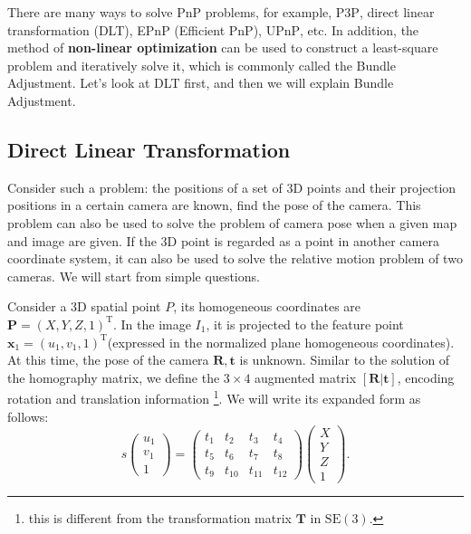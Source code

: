 There are many ways to solve PnP problems, for example, P3P\textsuperscript{\cite{GaoHouTangEtAl2003}}, direct linear transformation (DLT), EPnP (Efficient PnP)\textsuperscript{\cite{LepetitMoreno-NoguerFua2008 }}, UPnP\textsuperscript{\cite{Penate-SanchezAndrade-CettoMoreno-Noguer2013}}, etc. In addition, the method of \textbf{non-linear optimization} can be used to construct a least-square problem and iteratively solve it, which is commonly called the Bundle Adjustment. Let's look at DLT first, and then we will explain Bundle Adjustment.

\subsection{Direct Linear Transformation}
Consider such a problem: the positions of a set of 3D points and their projection positions in a certain camera are known, find the pose of the camera. This problem can also be used to solve the problem of camera pose when a given map and image are given. If the 3D point is regarded as a point in another camera coordinate system, it can also be used to solve the relative motion problem of two cameras. We will start from simple questions.

Consider a 3D spatial point $P$, its homogeneous coordinates are ${\bm{P}}=(X,Y,Z,1)^{\mathrm{T}}$. In the image $I_{1}$, it is projected to the feature point ${\bm{x}}_{1}=(u_{1},v_{1},1)^{\mathrm{T}}$(expressed in the normalized plane homogeneous coordinates). At this time, the pose of the camera $\bm{R}, \bm{t}$ is unknown. Similar to the solution of the homography matrix, we define the $3\times 4$ augmented matrix $[\bm{R}|\bm{t}]$, encoding rotation and translation information \footnote{this is different from the transformation matrix $\bm{T}$ in $\mathrm{SE}(3)$. }. We will write its expanded form as follows:
\begin{equation}
s
\begin{pmatrix}
u_{1} \\ v_{1} \\ 1
\end{pmatrix}
=
\begin{pmatrix}
t_{1} & t_{2} & t_{3} & t_{4}\\ 
t_{5} & t_{6} & t_{7} & t_{8}\\ 
t_{9} & t_{10} & t_{11} & t_{12}
\end{pmatrix}
\begin{pmatrix}
X \\ Y \\ Z \\ 1
\end{pmatrix}.
\end{equation}

